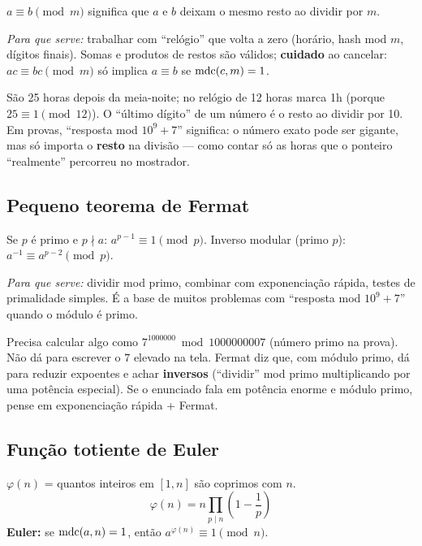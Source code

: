 $a \equiv b \pmod{m}$ significa que $a$ e $b$ deixam o mesmo resto ao dividir por $m$.

\emph{Para que serve:} trabalhar com ``relógio'' que volta a zero (horário, hash mod $m$, dígitos finais).
Somas e produtos de restos são válidos; \textbf{cuidado} ao cancelar: $ac \equiv bc \pmod{m}$ só implica $a \equiv b$ se $\operatorname{mdc}(c,m)=1$.

\begin{exemplodiabox}
São 25 horas depois da meia-noite; no relógio de 12 horas marca 1h (porque $25 \equiv 1 \pmod{12}$). O ``último dígito'' de um número é o resto ao dividir por 10. Em provas, ``resposta mod $10^9+7$'' significa: o número exato pode ser gigante, mas só importa o \textbf{resto} na divisão --- como contar só as horas que o ponteiro ``realmente'' percorreu no mostrador.
\end{exemplodiabox}



\subsection{Pequeno teorema de Fermat}

Se $p$ é primo e $p \nmid a$: $a^{p-1} \equiv 1 \pmod{p}$.
Inverso modular (primo $p$): $a^{-1} \equiv a^{p-2} \pmod{p}$.

\emph{Para que serve:} dividir mod primo, combinar com exponenciação rápida, testes de primalidade simples.
É a base de muitos problemas com ``resposta mod $10^9+7$'' quando o módulo é primo.

\begin{exemplodiabox}
Precisa calcular algo como $7^{1000000} \bmod 1000000007$ (número primo na prova). Não dá para escrever o $7$ elevado na tela. Fermat diz que, com módulo primo, dá para reduzir expoentes e achar \textbf{inversos} (``dividir'' mod primo multiplicando por uma potência especial). Se o enunciado fala em potência enorme e módulo primo, pense em exponenciação rápida + Fermat.
\end{exemplodiabox}



\subsection{Função totiente de Euler}

$\varphi(n)$ = quantos inteiros em $[1,n]$ são coprimos com $n$.
\begin{equation}
  \varphi(n) = n \prod_{p \mid n} \left(1 - \frac{1}{p}\right)
\end{equation}
\textbf{Euler:} se $\operatorname{mdc}(a,n)=1$, então $a^{\varphi(n)} \equiv 1 \pmod{n}$.

